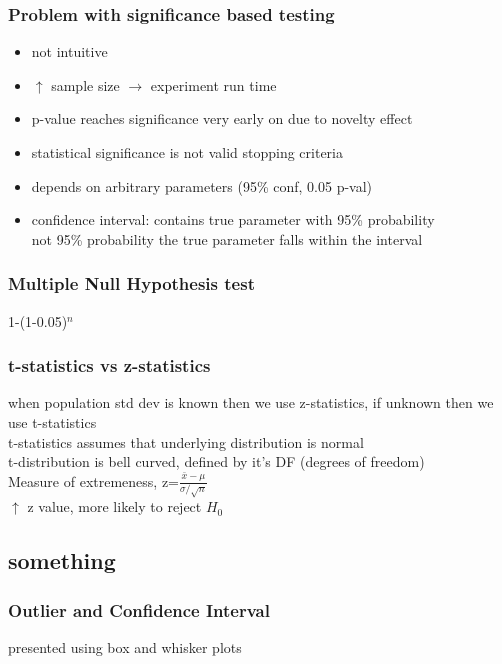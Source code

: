 \documentclass{beamer}
\begin{document}
\begin{frame}\frametitle{Problem with significance based testing}
	\begin{itemize}
		\item not intuitive
		\item $\uparrow$ sample size $\rightarrow$ experiment run time
		\item p-value reaches significance very early on due to novelty effect
		\item statistical significance is not valid stopping criteria
		\item depends on arbitrary parameters (95\% conf, 0.05 p-val)
		\item confidence interval: contains true parameter with 95\% probability\\
		not 95\% probability the true parameter falls within the interval\\
		
	\end{itemize}
\end{frame}


\begin{frame}\frametitle{Multiple Null Hypothesis test}
	1-(1-0.05)$^n$
\end{frame}

\begin{frame}\frametitle{t-statistics vs z-statistics}

when population std dev is known then we use z-statistics, if unknown then we use t-statistics\\
t-statistics assumes that underlying distribution is normal\\
t-distribution is bell curved, defined by it's DF (degrees of freedom)\\
Measure of extremeness, z=$\frac{\bar{x}-\mu}{\sigma/\sqrt{n}}$\\
$\uparrow$ z value, more likely to reject $H_0$

\end{frame}


\subsection{something}
\begin{frame}\frametitle{Outlier and Confidence Interval}
	presented using box and whisker plots\\
	
\end{frame}
\end{document}
